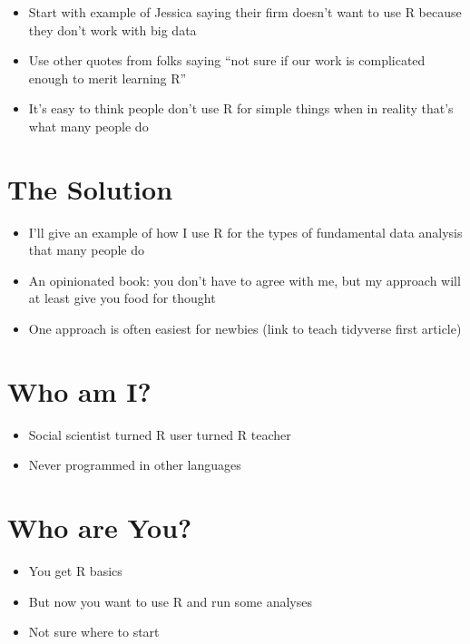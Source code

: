 \documentclass[]{book}
\providecommand{\tightlist}{%
  \setlength{\itemsep}{0pt}\setlength{\parskip}{0pt}}
\begin{document}
\begin{itemize}
\tightlist
\item
  Start with example of Jessica saying their firm doesn't want to use R because they don't work with big data
\item
  Use other quotes from folks saying ``not sure if our work is complicated enough to merit learning R''
\item
  It's easy to think people don't use R for simple things when in reality that's what many people do
\end{itemize}

\hypertarget{the-solution}{%
\section{The Solution}\label{the-solution}}

\begin{itemize}
\tightlist
\item
  I'll give an example of how I use R for the types of fundamental data analysis that many people do
\item
  An opinionated book: you don't have to agree with me, but my approach will at least give you food for thought
\item
  One approach is often easiest for newbies (link to teach tidyverse first article)
\end{itemize}

\hypertarget{who-am-i}{%
\section{Who am I?}\label{who-am-i}}

\begin{itemize}
\tightlist
\item
  Social scientist turned R user turned R teacher
\item
  Never programmed in other languages
\end{itemize}

\hypertarget{who-are-you}{%
\section{Who are You?}\label{who-are-you}}

\begin{itemize}
\tightlist
\item
  You get R basics
\item
  But now you want to use R and run some analyses
\item
  Not sure where to start
\end{itemize}


\end{document}
